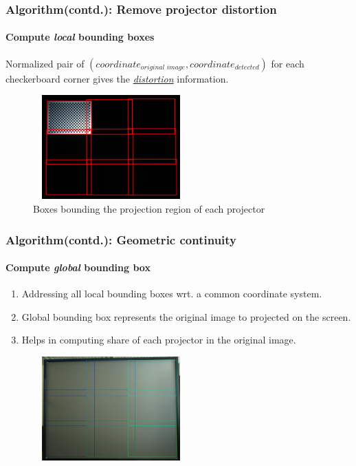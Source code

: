 \documentclass{beamer}
\begin{document}

\begin{frame}
\frametitle{Algorithm(contd.): Remove projector distortion}
\framesubtitle{Compute \textit{local} bounding boxes}
Normalized pair of $(coordinate_{\textit{original image}}, coordinate_{\textit{detected}})$ for each checkerboard corner gives the \textit{\hyperlink{concept}{distortion}} information.
\begin{figure}
\includegraphics[width=6cm,height=4cm]{figures/all_bboxes.jpg}
\caption{Boxes bounding the projection region of each projector}
\end{figure}

\end{frame}


\begin{frame}
\frametitle{Algorithm(contd.): Geometric continuity}
\framesubtitle{Compute \textit{global} bounding box}
\begin{enumerate}
\item Addressing all local bounding boxes wrt. a common coordinate system. 
\item Global bounding box represents the original image to projected on the screen.
\item Helps in computing share of each projector in the original image.
\end{enumerate}

\begin{figure}
\includegraphics[width=6cm,height=4cm]{figures/mod_all_bboxes.jpg}
\end{figure}
\end{frame}
\end{document}

